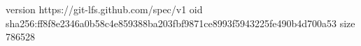 version https://git-lfs.github.com/spec/v1
oid sha256:ff8f8e2346a0b58c4e859388ba203fbf9871ce8993f5943225fe490b4d700a53
size 786528
